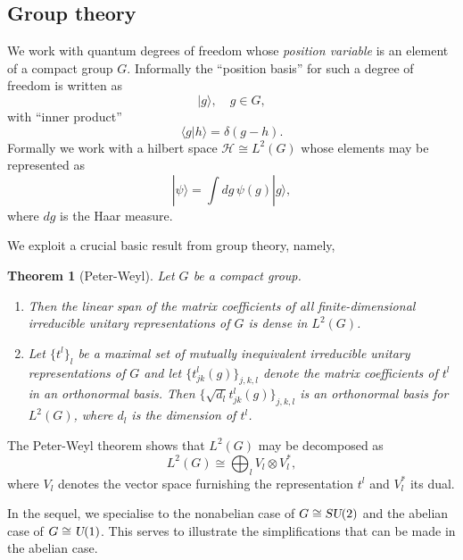 \documentclass[12pt]{amsart}
\def\su2{\textsl{SU}(2)}
\def\uone{\textsl{U}(1)}
\newtheorem{theorem}{Theorem}[section]
\theoremstyle{definition}
\theoremstyle{remark}
\numberwithin{equation}{section}
\begin{document}
\subsection{Group theory}
We work with quantum degrees of freedom whose \emph{position variable} is an element of a compact group $G$. Informally the ``position basis'' for such a degree of freedom is written as  
\begin{equation}
	|g\rangle, \quad g\in G,
\end{equation}
with ``inner product''
\begin{equation}
	\langle g|h\rangle = \delta(g-h).
\end{equation}
Formally we work with a hilbert space $\mathcal{H} \cong L^2(G)$ whose elements may be represented as
\begin{equation}
	|\psi\rangle = \int dg\, \psi(g)|g\rangle,
\end{equation}
where $dg$ is the Haar measure.

We exploit a crucial basic result from group theory, namely,
\begin{theorem}[Peter-Weyl]
	Let $G$ be a compact group. 
	\begin{enumerate} 
	\item Then the linear span of the matrix coefficients of all finite-dimensional irreducible unitary representations of  $G$ is dense in $L^2(G)$. 
	\item Let $\{t^l\}_l$ be a maximal set of mutually inequivalent irreducible unitary representations of $G$ and let $\{t_{jk}^l(g)\}_{j,k,l}$ denote the matrix coefficients of $t^l$ in an orthonormal basis. Then $\{\sqrt{d_l} t_{jk}^l(g)\}_{j,k,l}$ is an orthonormal basis for $L^2(G)$, where $d_l$ is the dimension of $t^l$.
	\end{enumerate}
\end{theorem}
The Peter-Weyl theorem shows that $L^2(G)$ may be decomposed as
\begin{equation}
	L^2(G) \cong \bigoplus_{l} V_l\otimes V_l^*,
\end{equation}
where $V_l$ denotes the vector space furnishing the representation $t^l$ and $V^*_l$ its dual.

In the sequel, we specialise to the nonabelian case of $G \cong \su2$
and the abelian case of $G \cong \uone$. This serves to illustrate the simplifications
that can be made in the abelian case.
\end{document}
